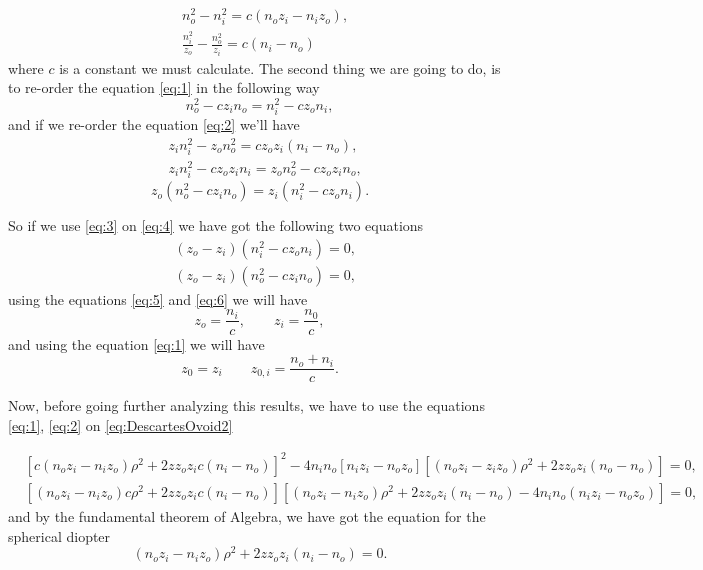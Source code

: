         \begin{align}
            & n_o^2 - n_i^2 = c\left( n_oz_i - n_iz_o \right)\label{eq:1},\\
            & \frac{n_i^2}{z_o} - \frac{n_o^2}{z_i} = c\left(n_i - n_o\right)\label{eq:2}
        \end{align}
        where $c$ is a constant we must calculate. The second thing we are going to do, is to re-order the equation \ref{eq:1} in the following way
        \begin{equation}\label{eq:3}
            n_o^2 - cz_in_o = n_i^2 - cz_on_i,
        \end{equation}
        and if we re-order the equation \ref{eq:2} we'll have
        \begin{align*}
            &z_in_i^2 - z_on_o^2 = cz_oz_i(n_i-n_o),\\
            &z_in_i^2 - cz_oz_in_i = z_on_o^2 - cz_oz_in_o,
        \end{align*}
        \begin{equation}\label{eq:4}
            z_o\left( n_o^2 - cz_in_o \right) = z_i \left( n_i^2 - cz_on_i \right).
        \end{equation}

        So if we use \ref{eq:3} on \ref{eq:4} we have got the following two equations
        \begin{align}
            & \left( z_o-z_i \right)\left( n_i^2 - cz_on_i \right) = 0 \label{eq:5},\\
            & \left( z_o-z_i \right)\left( n_o^2 - cz_in_o \right) = 0 \label{eq:6},
        \end{align}
        using the equations \ref{eq:5} and \ref{eq:6} we will have
        \begin{equation}\label{eq:Case1}
            z_o = \frac{n_i}{c}, \qquad z_i = \frac{n_0}{c},
        \end{equation}
        and using the equation \ref{eq:1} we will have
        \begin{equation}\label{eq:Case2}
            z_0 = z_i \qquad z_{0,i} = \frac{n_o+n_i}{c}.
        \end{equation}

        Now, before going further analyzing this results, we have to use the equations \ref{eq:1}, \ref{eq:2} on \ref{eq:DescartesOvoid2}

        \begin{align*}
        & \left[ c\left( n_oz_i - n_iz_o \right)\rho^2 + 2zz_oz_ic(n_i-n_o) \right]^2 - 4n_in_o \left[ n_iz_i - n_oz_o \right]\left[ \left( n_oz_i - z_iz_o \right)\rho^2 + 2zz_oz_i\left(n_o - n_o\right) \right]=0,\\
        & \left[\left( n_oz_i - n_iz_o \right)c\rho^2 + 2zz_oz_ic(n_i-n_o) \right]\left[ \left( n_oz_i - n_iz_o \right)\rho^2 + 2zz_oz_i(n_i-n_o) - 4n_in_o\left(n_iz_i-n_oz_o\right) \right] = 0,
        \end{align*}
        and by the fundamental theorem of Algebra, we have got the equation for the spherical diopter
        \begin{equation}\label{eq:SphericalDiopter}
            \left( n_oz_i - n_iz_o \right)\rho^2 + 2zz_oz_i(n_i-n_o) = 0.
        \end{equation}

